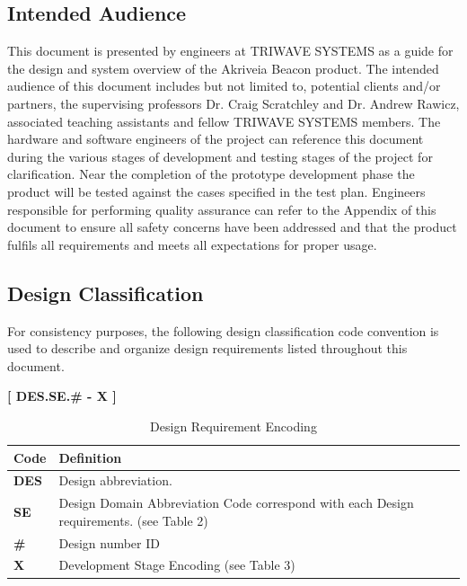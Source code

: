 \subsection{Intended Audience}
\medskip
This document is presented by engineers at TRIWAVE SYSTEMS as a guide for the design and system overview of the Akriveia Beacon product. The intended audience of this document includes but not limited to, potential clients and/or partners, the supervising professors Dr. Craig Scratchley and Dr. Andrew Rawicz, associated teaching assistants and fellow TRIWAVE SYSTEMS members. The hardware and software engineers of the project can reference this document during the various stages of development and testing stages of the project for clarification. Near the completion of the prototype development phase the product will be tested against the cases specified in the test plan. Engineers responsible for performing quality assurance can refer to the Appendix of this document to ensure all safety concerns have been addressed and that the product fulfils all requirements and meets all expectations for proper usage. 

\break
\subsection{Design  Classification}
For consistency purposes, the following design classification code convention is used to describe and organize design requirements listed throughout this document. 
\medskip
\begin{center}
	\textbf{[ DES.SE.\# - X ]} 
\end{center}

\bgroup
\def\arraystretch{1.5}
\begin{table}[H]
\centering
\begin{tabular}{ | m{1cm} | m{13cm}| } 
\hline
\rowcolor{lightgray} \textbf{Code} & \textbf{Definition} \\ 
\hline
 \textbf{DES} & Design abbreviation. \\ 
\hline
 \textbf{SE} & Design Domain Abbreviation Code correspond with each Design requirements. (see Table 2)\\   
\hline
 \textbf{\#} & Design number ID \\ 
\hline
 \textbf{X} & Development Stage Encoding (see Table 3)\\ 
\hline
\end{tabular}
\caption{Design Requirement Encoding}
\end{table}

